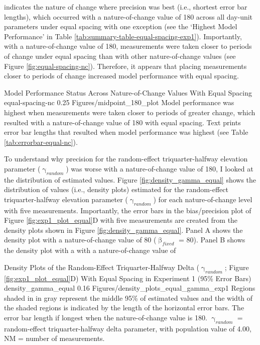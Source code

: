 \documentclass[
12pt, %
twoside,
english]{guelphthesis}
\begin{document}
\noindent indicates the nature of change where precision was best (i.e., shortest error bar lengths), which occurred with a nature-of-change value of 180 across all day-unit parameters under equal spacing with one exception (see the `Highest Model Performance' in Table \ref{tab:summary-table-equal-spacing-exp1}). Importantly, with a nature-of-change value of 180, measurements were taken closer to periods of change under equal spacing than with other nature-of-change values (see Figure \ref{fig:equal-spacing-nc}). Therefore, it appears that placing measurements closer to periods of change increased model performance with equal spacing.
\begin{apaFigure}
[portrait]
[samepage]
[0cm]
{Model Performance Status Across Nature-of-Change Values With Equal Spacing}
{equal-spacing-nc}
{0.25}
{Figures/midpoint_180_plot}
{Model performance was highest when measurements were taken closer to periods of greater change, which resulted with a nature-of-change value of 180 with equal spacing. Text prints error bar lengths that resulted when model performance was highest (see Table \ref{tab:errorbar-equal-nc}).}
\end{apaFigure}
To understand why precision for the random-effect triquarter-halfway elevation parameter (\(\upgamma_{random}\)) was worse with a nature-of-change value of 180, I looked at the distribution of estimated values. Figure \ref{fig:density_gamma_equal} shows the distribution of values (i.e., density plots) estimated for the random-effect triquarter-halfway elevation parameter (\(\upgamma_{random}\)) for each nature-of-change level with five measurements. Importantly, the error bars in the bias/precision plot of Figure \ref{fig:exp1_plot_equal}D with five measurements are created from the density plots shown in Figure \ref{fig:density_gamma_equal}. Panel A shows the density plot with a nature-of-change value of 80 (\(\upbeta_{fixed}\) = 80). Panel B shows the density plot with a with a nature-of-change value of
\begin{apaFigure}
[portrait]
[samepage]
[0cm]
{Density Plots of the Random-Effect Triquarter-Halfway Delta ($\upgamma_{random}$; Figure \ref{fig:exp1_plot_equal}D) With Equal Spacing in Experiment 1 (95\% Error Bars)}
{density_gamma_equal}
{0.16}
{Figures/density_plots_equal_gamma_exp1}
{Regions shaded in in gray represent the middle 95\% of estimated values and the width of the shaded regions is indicated by the length of the horizontal error bars. The error bar length if longest when the nature-of-change value is 180. $\upgamma_{random}$ = random-effect triquarter-halfway delta parameter, with population value of 4.00, NM = number of measurements.}
\end{apaFigure}
\end{document}
